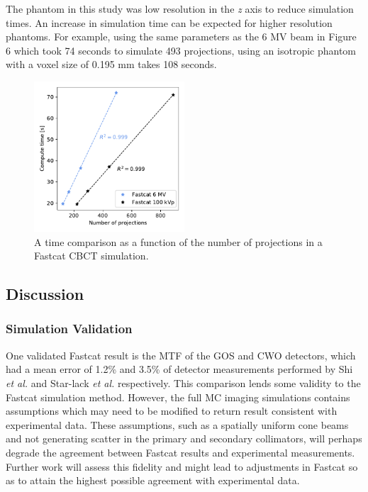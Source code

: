 The phantom in this study was low resolution in the \textit{z} axis to reduce simulation times. An increase in simulation time can be expected for higher resolution phantoms. For example, using the same parameters as the 6 MV beam in Figure 6 which took 74 seconds to simulate 493 projections, using an isotropic phantom with a voxel size of 0.195 mm takes 108 seconds.

\begin{figure}[h!]
  \begin{center}
 
  \includegraphics[width=0.5\textwidth, clip]{figures/speed.pdf}
  \caption{A time comparison as a function of the number of projections in a Fastcat CBCT simulation. 
 \label{speed} 
    }  %
    \end{center}
\end{figure}

\subsection{Discussion}

\subsubsection{Simulation Validation}
One validated Fastcat result is the MTF of the GOS and CWO detectors, which had a mean error of 1.2\% and 3.5\% of detector measurements performed by Shi \textit{et al.} and Star-lack \textit{et al.} respectively. This comparison lends some validity to the Fastcat simulation method. However, the full MC imaging simulations contains assumptions which may need to be modified to return result consistent with experimental data. These assumptions, such as a spatially uniform cone beams and not generating scatter in the primary and secondary collimators, will perhaps degrade the agreement between Fastcat results and experimental measurements. Further work will assess this fidelity and might lead to adjustments in Fastcat so as to attain the highest possible agreement with experimental data.

